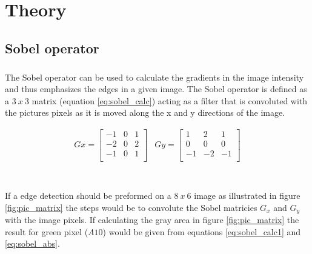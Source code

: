 \chapter{Theory}

\section{Sobel operator}
\label{sec:Sobel}
\paragraph*{}
The Sobel operator can be used to calculate the gradients in the image intensity and thus emphasizes the edges in a given image. The Sobel operator is defined as a $3~x~3$ matrix (equation \ref{eq:sobel_calc}) acting as a filter that is convoluted with the pictures pixels as it is moved along the x and y directions of the image.

\begin{equation}
\begin{array}{cc}
Gx = \left[ 
\begin{array}{ccc}
	-1 & 0 & 1\\
    -2 & 0 & 2\\
    -1 & 0 & 1\\
\end{array} \right] &
Gy = \left[ 
\begin{array}{ccc}
	1 & 2 & 1\\
    0 & 0 & 0\\
    -1 & -2 & -1\\
\end{array}
\right]
\end{array}
\label{eq:sobel_calc}
\end{equation}\\

\paragraph*{}
If a edge detection should be preformed on a $8~x~6$ image as illustrated in figure \ref{fig:pic_matrix} the steps would be to convolute the Sobel matricies $G_x$ and $G_y$ with the image pixels. If calculating the gray area in figure \ref{fig:pic_matrix} the result for green pixel ($A10$) would be given from equations \ref{eq:sobel_calc1} and \ref{eq:sobel_abs}.  

